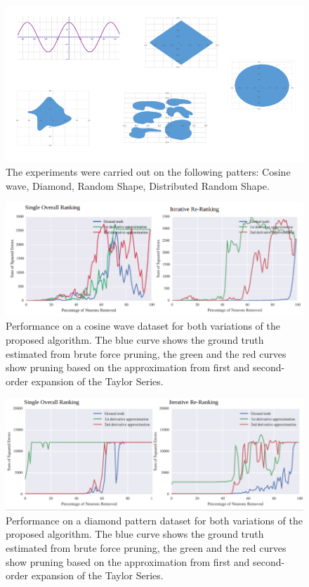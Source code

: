 \begin{figure}
  \includegraphics[width=\linewidth]{datasets.png}
  \caption{The experiments were carried out on the following patters: Cosine wave, Diamond, Random Shape, Distributed Random Shape.}
  \label{fig:datasets}
\end{figure}

\begin{figure}
  \includegraphics[width=\linewidth]{cosine.png}
  \caption{Performance on a cosine wave dataset for both variations of the proposed algorithm. The blue curve shows the ground truth estimated from brute force pruning, the green and the red curves show pruning based on the approximation from first and second-order expansion of the Taylor Series.}
  \label{fig:cosine}
\end{figure}

\begin{figure}
  \includegraphics[width=\linewidth]{diamond.png}
  \caption{Performance on a diamond pattern dataset for both variations of the proposed algorithm. The blue curve shows the ground truth estimated from brute force pruning, the green and the red curves show pruning based on the approximation from first and second-order expansion of the Taylor Series.}
  \label{fig:diamond}
\end{figure}

